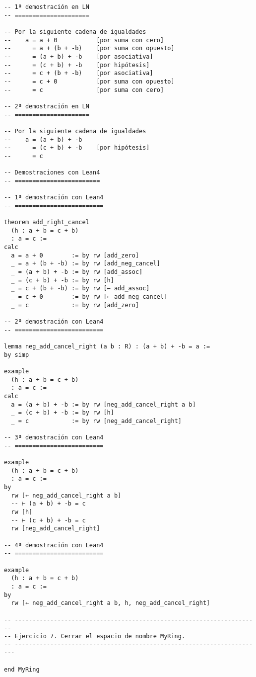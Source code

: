 \begin{verbatim}
-- 1ª demostración en LN
-- =====================

-- Por la siguiente cadena de igualdades
--    a = a + 0           [por suma con cero]
--      = a + (b + -b)    [por suma con opuesto]
--      = (a + b) + -b    [por asociativa]
--      = (c + b) + -b    [por hipótesis]
--      = c + (b + -b)    [por asociativa]
--      = c + 0           [por suma con opuesto]
--      = c               [por suma con cero]

-- 2ª demostración en LN
-- =====================

-- Por la siguiente cadena de igualdades
--    a = (a + b) + -b
--      = (c + b) + -b    [por hipótesis]
--      = c

-- Demostraciones con Lean4
-- ========================

-- 1ª demostración con Lean4
-- =========================

theorem add_right_cancel
  (h : a + b = c + b)
  : a = c :=
calc
  a = a + 0        := by rw [add_zero]
  _ = a + (b + -b) := by rw [add_neg_cancel]
  _ = (a + b) + -b := by rw [add_assoc]
  _ = (c + b) + -b := by rw [h]
  _ = c + (b + -b) := by rw [← add_assoc]
  _ = c + 0        := by rw [← add_neg_cancel]
  _ = c            := by rw [add_zero]

-- 2ª demostración con Lean4
-- =========================

lemma neg_add_cancel_right (a b : R) : (a + b) + -b = a :=
by simp

example
  (h : a + b = c + b)
  : a = c :=
calc
  a = (a + b) + -b := by rw [neg_add_cancel_right a b]
  _ = (c + b) + -b := by rw [h]
  _ = c            := by rw [neg_add_cancel_right]

-- 3ª demostración con Lean4
-- =========================

example
  (h : a + b = c + b)
  : a = c :=
by
  rw [← neg_add_cancel_right a b]
  -- ⊢ (a + b) + -b = c
  rw [h]
  -- ⊢ (c + b) + -b = c
  rw [neg_add_cancel_right]

-- 4ª demostración con Lean4
-- =========================

example
  (h : a + b = c + b)
  : a = c :=
by
  rw [← neg_add_cancel_right a b, h, neg_add_cancel_right]

-- ---------------------------------------------------------------------
-- Ejercicio 7. Cerrar el espacio de nombre MyRing.
-- ----------------------------------------------------------------------

end MyRing
\end{verbatim}

